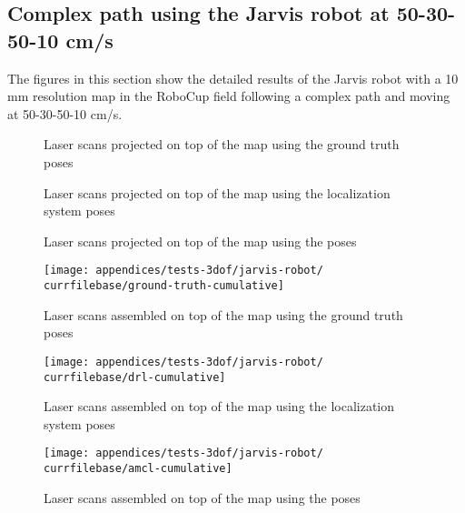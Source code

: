 \subsection{Complex path using the Jarvis robot at 50-30-50-10 cm/s}\label{subsec:appendix-a_jarvis-robot-tests_complex-path-using-the-jarvis-robot-at-50-30-50-10-cm-s}

The figures in this section show the detailed results of the Jarvis robot with a 10 mm resolution map in the RoboCup field following a complex path and moving at 50-30-50-10 cm/s.


\begin{figure}[H]
	\centering
	\caption{Laser scans projected on top of the map using the ground truth poses}
\end{figure}

\begin{figure}[H]
	\centering
	\caption{Laser scans projected on top of the map using the localization system poses}
\end{figure}

\begin{figure}[H]
	\centering
	\caption{Laser scans projected on top of the map using the  poses}
\end{figure}


\begin{figure}[H]
	\centering
	\texttt{[image: appendices/tests-3dof/jarvis-robot/\\currfilebase/ground-truth-cumulative]}
	\caption{Laser scans assembled on top of the map using the ground truth poses}
\end{figure}

\begin{figure}[H]
	\centering
	\texttt{[image: appendices/tests-3dof/jarvis-robot/\\currfilebase/drl-cumulative]}
	\caption{Laser scans assembled on top of the map using the localization system poses}
\end{figure}

\begin{figure}[H]
	\centering
	\texttt{[image: appendices/tests-3dof/jarvis-robot/\\currfilebase/amcl-cumulative]}
	\caption{Laser scans assembled on top of the map using the  poses}
\end{figure}


